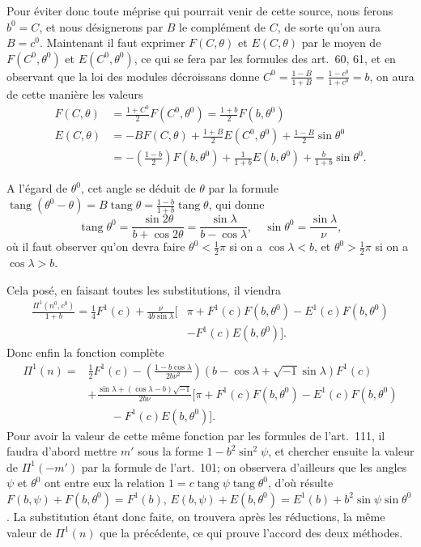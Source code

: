 \documentclass{article}
\begin{document}
Pour éviter donc toute méprise qui pourrait venir de cette source, nous ferons $b^{0}=C$, et nous désignerons par $B$ le complément de $C$, de sorte qu'on aura $B=c^{0}$. Maintenant il faut exprimer $F(C,\theta)$ et $E(C,\theta)$ par le moyen de $F(C^{0},\theta^{0})$ et $E(C^{0},\theta^{0})$, ce qui se fera par les formules des art.\ 60, 61, et en observant que la loi des modules décroissans donne $C^{0}=\frac{1-B}{1+B}=\frac{1-c^{0}}{1+c^{0}}=b$, on aura de cette manière les valeurs
\[ \begin{aligned} F(C,\theta)&=\frac{1+C^{0}}{2}F(C^{0},\theta^{0})=\frac{1+b}{2}F(b,\theta^{0})\\ E(C,\theta)&=-BF(C,\theta)+\frac{1+B}{2}E(C^{0},\theta^{0})+\frac{1-B}{2}\sin\theta^{0}\\ &=-\left(\frac{1-b}{2}\right)F(b,\theta^{0})+\frac{1}{1+b}E(b,\theta^{0})+\frac{b}{1+b}\sin\theta^{0}. \end{aligned} \]

A l'égard de $\theta^{0}$, cet angle se déduit de $\theta$ par la formule $\operatorname{tang}(\theta^{0}-\theta)=B\operatorname{tang}\theta=\frac{1-b}{1+b}\operatorname{tang}\theta$, qui donne
\[ \operatorname{tang}\theta^{0}=\frac{\sin 2\theta}{b+\cos 2\theta}=\frac{\sin\lambda}{b-\cos\lambda},\quad \sin\theta^{0}=\frac{\sin\lambda}{\nu}, \]
où il faut observer qu'on devra faire $\theta^{0}<\frac{1}{2}\pi$ si on a $\cos\lambda<b$, et $\theta^{0}>\frac{1}{2}\pi$ si on a $\cos\lambda>b$.

Cela posé, en faisant toutes les substitutions, il viendra
\[ \begin{aligned} \frac{\Pi^{1}(n^{0},c^{0})}{1+b}=\tfrac{1}{4}F^{1}(c)+\frac{\nu}{4b\sin\lambda}[&\pi+F^{1}(c)F(b,\theta^{0})-E^{1}(c)F(b,\theta^{0})\\ &-F^{1}(c)E(b,\theta^{0})]. \end{aligned} \]
Donc enfin la fonction complète
\[ \begin{aligned} \Pi^{1}(n)={}&\tfrac{1}{2}F^{1}(c)-\left(\frac{1-b\cos\lambda}{2b\nu^{2}}\right)(b-\cos\lambda+\sqrt{-1}\sin\lambda)F^{1}(c)\\ &+\frac{\sin\lambda+(\cos\lambda-b)\sqrt{-1}}{2b\nu}[\pi+F^{1}(c)F(b,\theta^{0})-E^{1}(c)F(b,\theta^{0})\\ &\qquad-F^{1}(c)E(b,\theta^{0})]. \end{aligned} \]
Pour avoir la valeur de cette même fonction par les formules de l'art.\ 111, il faudra d'abord mettre $m'$ sous la forme $1-b^{2}\sin^{2}\psi$, et chercher ensuite la valeur de $\Pi^{1}(-m')$ par la formule de l'art.\ 101; on observera d'ailleurs que les angles $\psi$ et $\theta^{0}$ ont entre eux la relation $1=c\operatorname{tang}\psi\operatorname{tang}\theta^{0}$, d'où résulte $F(b,\psi)+F(b,\theta^{0})=F^{1}(b)$, $E(b,\psi)+E(b,\theta^{0})=E^{1}(b)+b^{2}\sin\psi\sin\theta^{0}$. La substitution étant donc faite, on trouvera après les réductions, la même valeur de $\Pi^{1}(n)$ que la précédente, ce qui prouve l'accord des deux méthodes.
\end{document}
